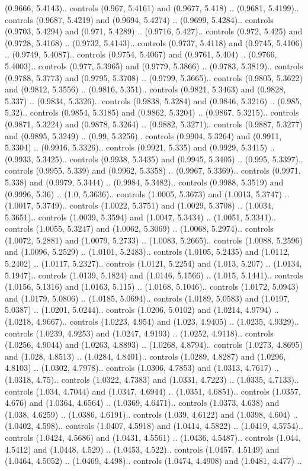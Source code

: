 (0.9666, 5.4143).. controls (0.967, 5.4161) and (0.9677, 5.418) .. (0.9681, 5.4199).. controls (0.9687, 5.4219) and (0.9694, 5.4274) .. (0.9699, 5.4284).. controls (0.9703, 5.4294) and (0.971, 5.4289) .. (0.9716, 5.427).. controls (0.972, 5.425) and (0.9728, 5.4168) .. (0.9732, 5.4143).. controls (0.9737, 5.4118) and (0.9745, 5.4106) .. (0.9749, 5.4087).. controls (0.9754, 5.4067) and (0.9761, 5.404) .. (0.9766, 5.4003).. controls (0.977, 5.3965) and (0.9779, 5.3866) .. (0.9783, 5.3819).. controls (0.9788, 5.3773) and (0.9795, 5.3708) .. (0.9799, 5.3665).. controls (0.9805, 5.3622) and (0.9812, 5.3556) .. (0.9816, 5.351).. controls (0.9821, 5.3463) and (0.9828, 5.337) .. (0.9834, 5.3326).. controls (0.9838, 5.3284) and (0.9846, 5.3216) .. (0.985, 5.32).. controls (0.9854, 5.3185) and (0.9862, 5.3204) .. (0.9867, 5.3215).. controls (0.9871, 5.3224) and (0.9878, 5.3264) .. (0.9882, 5.3271).. controls (0.9887, 5.3277) and (0.9895, 5.3249) .. (0.99, 5.3256).. controls (0.9904, 5.3264) and (0.9911, 5.3304) .. (0.9916, 5.3326).. controls (0.9921, 5.335) and (0.9929, 5.3415) .. (0.9933, 5.3425).. controls (0.9938, 5.3435) and (0.9945, 5.3405) .. (0.995, 5.3397).. controls (0.9955, 5.339) and (0.9962, 5.3358) .. (0.9967, 5.3369).. controls (0.9971, 5.338) and (0.9979, 5.3444) .. (0.9984, 5.3482).. controls (0.9988, 5.3519) and (0.9996, 5.36) .. (1.0, 5.3636).. controls (1.0005, 5.3673) and (1.0013, 5.3747) .. (1.0017, 5.3749).. controls (1.0022, 5.3751) and (1.0029, 5.3708) .. (1.0034, 5.3651).. controls (1.0039, 5.3594) and (1.0047, 5.3434) .. (1.0051, 5.3341).. controls (1.0055, 5.3247) and (1.0062, 5.3069) .. (1.0068, 5.2974).. controls (1.0072, 5.2881) and (1.0079, 5.2733) .. (1.0083, 5.2665).. controls (1.0088, 5.2596) and (1.0096, 5.2529) .. (1.0101, 5.2483).. controls (1.0105, 5.2435) and (1.0112, 5.2402) .. (1.0117, 5.2327).. controls (1.0121, 5.2254) and (1.013, 5.207) .. (1.0134, 5.1947).. controls (1.0139, 5.1824) and (1.0146, 5.1566) .. (1.015, 5.1441).. controls (1.0156, 5.1316) and (1.0163, 5.115) .. (1.0168, 5.1046).. controls (1.0172, 5.0943) and (1.0179, 5.0806) .. (1.0185, 5.0694).. controls (1.0189, 5.0583) and (1.0197, 5.0387) .. (1.0201, 5.0244).. controls (1.0206, 5.0102) and (1.0214, 4.9794) .. (1.0218, 4.9667).. controls (1.0223, 4.954) and (1.023, 4.9405) .. (1.0235, 4.9329).. controls (1.0239, 4.9253) and (1.0247, 4.9193) .. (1.0252, 4.9118).. controls (1.0256, 4.9044) and (1.0263, 4.8893) .. (1.0268, 4.8794).. controls (1.0273, 4.8695) and (1.028, 4.8513) .. (1.0284, 4.8401).. controls (1.0289, 4.8287) and (1.0296, 4.8103) .. (1.0302, 4.7978).. controls (1.0306, 4.7853) and (1.0313, 4.7617) .. (1.0318, 4.75).. controls (1.0322, 4.7383) and (1.0331, 4.7223) .. (1.0335, 4.7133).. controls (1.034, 4.7044) and (1.0347, 4.6944) .. (1.0351, 4.6851).. controls (1.0357, 4.676) and (1.0364, 4.6564) .. (1.0369, 4.6471).. controls (1.0373, 4.638) and (1.038, 4.6259) .. (1.0386, 4.6191).. controls (1.039, 4.6122) and (1.0398, 4.604) .. (1.0402, 4.598).. controls (1.0407, 4.5918) and (1.0414, 4.5822) .. (1.0419, 4.5754).. controls (1.0424, 4.5686) and (1.0431, 4.5561) .. (1.0436, 4.5487).. controls (1.044, 4.5412) and (1.0448, 4.529) .. (1.0453, 4.522).. controls (1.0457, 4.5149) and (1.0464, 4.5052) .. (1.0469, 4.498).. controls (1.0474, 4.4908) and (1.0481, 4.477) .. 
